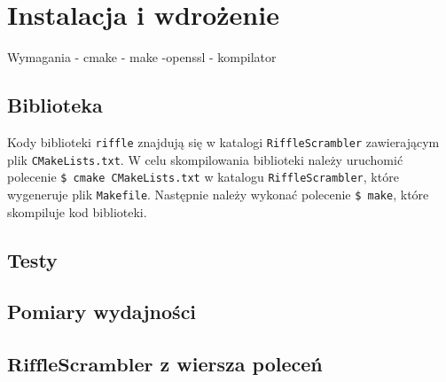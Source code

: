 \chapter{Instalacja i wdrożenie}
\thispagestyle{chapterBeginStyle}

Wymagania - cmake - make -openssl - kompilator

\section{Biblioteka}
Kody biblioteki \texttt{riffle} znajdują się w katalogi \texttt{RiffleScrambler} zawierającym 
plik \texttt{CMakeLists.txt}.
W celu skompilowania biblioteki należy uruchomić polecenie \texttt{\$ cmake CMakeLists.txt} w katalogu \texttt{RiffleScrambler}, które wygeneruje plik \texttt{Makefile}. Następnie należy wykonać polecenie \texttt{\$ make}, które skompiluje kod biblioteki.


\section{Testy}


\section{Pomiary wydajności}


\section{$\mathbf{RiffleScrambler}$ z wiersza poleceń}
